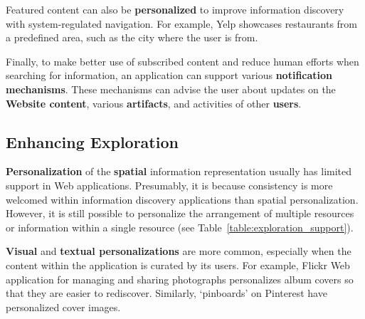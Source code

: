 \documentclass{sigchi}
\begin{document}
{{{\begin{table}[ht!]
\begin{tabular}{|p{0.35\linewidth}|p{0.60\linewidth}|}
\end{tabular}
\end{table}

Featured content can also be \textbf{personalized} to improve information discovery with system-regulated navigation. For example, Yelp showcases restaurants from a predefined area, such as the city where the user is from.

Finally, to make better use of subscribed content and reduce human efforts when searching for information, an application can support various \textbf{notification mechanisms}. These mechanisms can advise the user about updates on the \textbf{Website content}, various \textbf{artifacts}, and activities of other \textbf{users}.  

} %
{\subsection{Enhancing Exploration}
\textbf{Personalization} of the \textbf{spatial} information representation usually has limited support in Web applications. Presumably, it is because consistency is more welcomed within information discovery applications than spatial personalization. However, it is still possible to personalize the arrangement of multiple resources or information within a single resource (see Table~\ref{table:exploration_support}). 

\textbf{Visual} and \textbf{textual personalizations} are more common, especially when the content within the application is curated by its users.  For example, Flickr Web application for managing and sharing photographs personalizes album covers so that they are easier to rediscover. Similarly, `pinboards' on Pinterest have personalized cover images.

}}}
\end{document}
